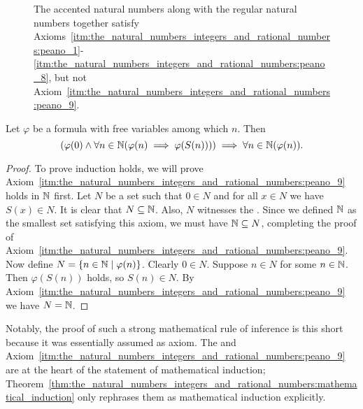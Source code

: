 \documentclass[../main.tex]{subfiles}
\begin{document}
\begin{figure}[!htbp]
    \centering
    
    \caption{The accented natural numbers along with the regular natural numbers together satisfy Axioms~\ref{itm:the_natural_numbers_integers_and_rational_numbers:peano_1}\nobreakdashes-\ref{itm:the_natural_numbers_integers_and_rational_numbers:peano_8}, but not Axiom~\ref{itm:the_natural_numbers_integers_and_rational_numbers:peano_9}.}
    \label{fig:the_natural_numbers_integers_and_rational_numbers:axiom_of_induction}
\end{figure}
\begin{theorem}\label{thm:the_natural_numbers_integers_and_rational_numbers:mathematical_induction}
    Let $\varphi$ be a formula with free variables among which $n$. Then
    \begin{equation*}
        \left(\varphi(0)\land\forall n\in\mathbb{N}(\varphi(n)\implies\varphi(S(n)))\right)\implies\forall n\in\mathbb{N}(\varphi(n)).
    \end{equation*}
\end{theorem}
\begin{proof}
    To prove induction holds, we will prove Axiom~\ref{itm:the_natural_numbers_integers_and_rational_numbers:peano_9} holds in $\mathbb{N}$ first. Let $N$ be a set such that $0\in N$ and for all $x\in N$ we have $S(x)\in N$. It is clear that $N\subseteq\mathbb{N}$. Also, $N$ witnesses the . Since we defined $\mathbb{N}$ as the smallest set satisfying this axiom, we must have $\mathbb{N}\subseteq N$, completing the proof of Axiom~\ref{itm:the_natural_numbers_integers_and_rational_numbers:peano_9}. Now define $N=\{n\in\mathbb{N}\mid\varphi(n)\}$. Clearly $0\in N$. Suppose $n\in N$ for some $n\in\mathbb{N}$. Then $\varphi(S(n))$ holds, so $S(n)\in N$. By Axiom~\ref{itm:the_natural_numbers_integers_and_rational_numbers:peano_9} we have $N=\mathbb{N}$.
\end{proof}
Notably, the proof of such a strong mathematical rule of inference is this short because it was essentially assumed as axiom. The  and Axiom~\ref{itm:the_natural_numbers_integers_and_rational_numbers:peano_9} are at the heart of the statement of mathematical induction; Theorem~\ref{thm:the_natural_numbers_integers_and_rational_numbers:mathematical_induction} only rephrases them as mathematical induction explicitly.
\end{document}
